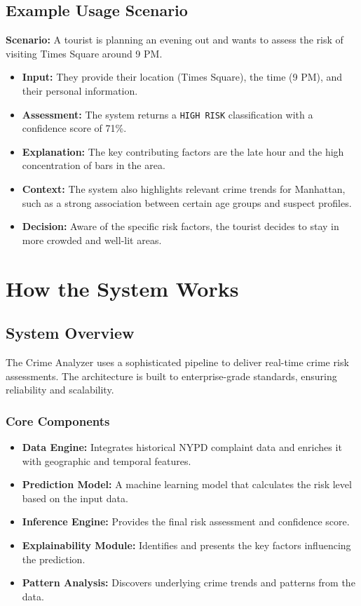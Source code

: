 \documentclass[11pt]{article}
\begin{document}
\subsection{Example Usage Scenario}
\textbf{Scenario:} A tourist is planning an evening out and wants to assess the risk of visiting Times Square around 9 PM.
\begin{itemize}[leftmargin=*]
    \item \textbf{Input:} They provide their location (Times Square), the time (9 PM), and their personal information.
    \item \textbf{Assessment:} The system returns a \texttt{HIGH RISK} classification with a confidence score of 71\%.
    \item \textbf{Explanation:} The key contributing factors are the late hour and the high concentration of bars in the area.
    \item \textbf{Context:} The system also highlights relevant crime trends for Manhattan, such as a strong association between certain age groups and suspect profiles.
    \item \textbf{Decision:} Aware of the specific risk factors, the tourist decides to stay in more crowded and well-lit areas.
\end{itemize}

\section{How the System Works}

\subsection{System Overview}
The Crime Analyzer uses a sophisticated pipeline to deliver real-time crime risk assessments. The architecture is built to enterprise-grade standards, ensuring reliability and scalability.

\subsubsection{Core Components}
\begin{itemize}[leftmargin=*]
\item \textbf{Data Engine:} Integrates historical NYPD complaint data and enriches it with geographic and temporal features.
\item \textbf{Prediction Model:} A machine learning model that calculates the risk level based on the input data.
\item \textbf{Inference Engine:} Provides the final risk assessment and confidence score.
\item \textbf{Explainability Module:} Identifies and presents the key factors influencing the prediction.
\item \textbf{Pattern Analysis:} Discovers underlying crime trends and patterns from the data.
\end{itemize}
\end{document}
